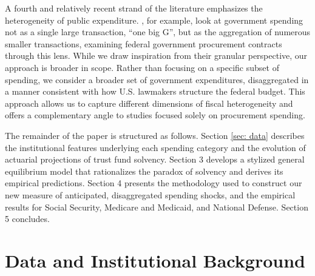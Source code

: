 \documentclass[12pt]{article}%
\theoremstyle{remark}
\begin{document}
A fourth and relatively recent strand of the literature emphasizes the heterogeneity of public expenditure. \cite{coxetal_24}, for example, look at government spending not as a single large transaction, “one big G”, but as the aggregation of numerous smaller transactions, examining federal government procurement contracts through this lens. While we draw inspiration from their granular perspective, our approach is broader in scope. Rather than focusing on a specific subset of spending, we consider a broader set of government expenditures, disaggregated in a manner consistent with how U.S. lawmakers structure the federal budget. This approach allows us to capture different dimensions of fiscal heterogeneity and offers a complementary angle to studies focused solely on procurement spending.


The remainder of the paper is structured as follows. Section \ref{sec: data} describes the institutional features underlying each spending category and the evolution of actuarial projections of trust fund solvency. Section 3 develops a stylized general equilibrium model that rationalizes the paradox of solvency and derives its empirical predictions. Section 4 presents the methodology used to construct our new measure of anticipated, disaggregated spending shocks, and the empirical results for Social Security, Medicare and Medicaid, and National Defense. Section 5 concludes.


\section{Data and Institutional Background\label{sec: data}}\label{sec:background}
\end{document}

